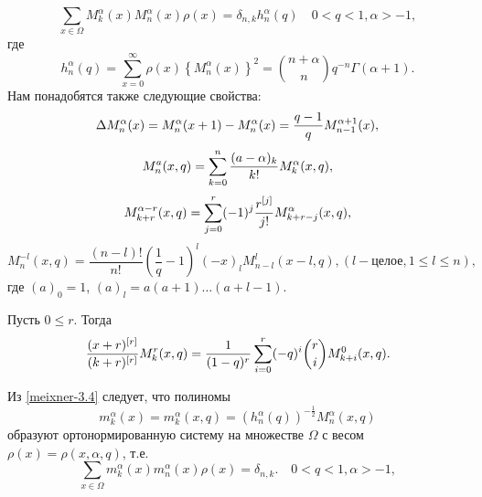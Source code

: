 \begin{equation}\label{meixner-3.4}
\sum_{x\in\Omega}M_k^\alpha(x)M_n^\alpha(x)\rho(x)=\delta_{n,k}
     h_n^\alpha(q) \quad 0<q<1,\alpha>-1,
\end{equation}
где
\begin{equation}\label{meixner-3.5}
  h_n^\alpha(q)=\sum_{x=0}^\infty\rho(x)
 \left\{M_n^\alpha(x)\right\}^2=
      {n+\alpha\choose n}q^{-n}\Gamma(\alpha+1).
\end{equation}
Нам понадобятся также следующие свойства:
\begin{equation}\label{meixner-3.6}
 \Delta M_n^\alpha(x)=M_n^\alpha(x+1)-M_n^\alpha(x)= {q-1\over
q}M_{n-1}^{\alpha+1}(x),
\end{equation}
\begin{equation}\label{meixner-3.7}
 M_n^a(x,q)=\sum_{k=0}^n  {(a-\alpha)_k\over k!}M_k^\alpha(x,q),
 \end{equation}
\begin{equation}\label{meixner-3.8}
M_{k+r}^{\alpha-r}(x,q)=\sum_{j=0}^r(-1)^j{r^{[j]}\over
j!}M_{k+r-j}^\alpha(x,q),
  \end{equation}
\begin{equation}\label{meixner-3.9}
M_{n}^{-l}(x,q)=\frac{(n-l)!}{n!}\left(\frac1q-1\right)^l(-x)_lM_{n-l}^{l}(x-l,q), (l -\text{целое}, 1\le l\le n ),
  \end{equation}
где $(a)_0=1$, $(a)_l=a(a+1)\ldots (a+l-1)$.

\begin{lemma}\label{meilem2}
Пусть  $0\le r$. Тогда
     $$
{(x+r)^{[r]}\over (k+r)^{[r]}}M_k^r(x,q)={1\over(1-q)^r}
     \sum_{i=0}^r(-q)^i{r\choose i}M_{k+i}^0(x,q).
     $$
\end{lemma}

Из \eqref{meixner-3.4} следует, что полиномы
\begin{equation}\label{meixner-3.12}
m_k^\alpha(x)=m_k^\alpha(x,q)=(h_n^\alpha(q))^{-\frac12}M_n^\alpha(x,q)
\end{equation}
образуют ортонормированную систему на множестве $\Omega$  с весом $\rho(x)=\rho(x,\alpha,q)$, т.е.
\begin{equation}\label{meixner-3.13}
\sum_{x\in\Omega}m_k^\alpha(x)m_n^\alpha(x)\rho(x)=\delta_{n,k}.
 \quad 0<q<1,\alpha>-1,
\end{equation}

